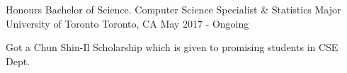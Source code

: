 

\begin{cventries}

  \cventry
    {Honours Bachelor of Science. Computer Science Specialist & Statistics Major} %
    {University of Toronto} %
    {Toronto, CA} %
    {May 2017 - Ongoing} %
    {
      \begin{cvitems} %
        \item {Got a Chun Shin-Il Scholarship which is given to promising students in CSE Dept.}
      \end{cvitems}
    }
\end{cventries}
